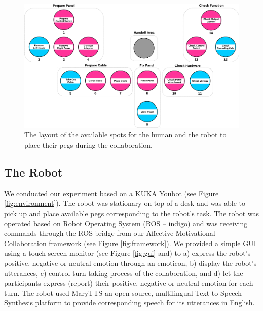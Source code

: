 \documentclass[12pt]{report}
\begin{document}
\begin{figure}[tbh]
  \centering
  \includegraphics[width=1\textwidth]{figure/gameBoard.pdf}
  \caption{\fontsize{10}{10}\selectfont The layout of the available spots for
  the human and the robot to place their pegs during the collaboration.}
  \label{fig:game_board}
\end{figure}

\subsection{The Robot}

We conducted our experiment based on a KUKA Youbot (see Figure
\ref{fig:environment}). The robot was stationary on top of a desk and was able
to pick up and place available pegs corresponding to the robot's task. The robot
was operated based on Robot Operating System (ROS -- indigo) and was receiving
commands through the ROS-bridge from our Affective Motivational Collaboration
framework (see Figure \ref{fig:framework}). We provided a simple GUI using a
touch-screen monitor (see Figure \ref{fig:gui} and) to a) express the robot's
positive, negative or neutral emotion through an emoticon, b) display the
robot's utterances, c) control turn-taking process of the collaboration, and d)
let the participants express (report) their positive, negative or neutral
emotion for each turn. The robot used MaryTTS an open-source, multilingual
Text-to-Speech Synthesis platform to provide corresponding speech for its
utterances in English.
\end{document}
